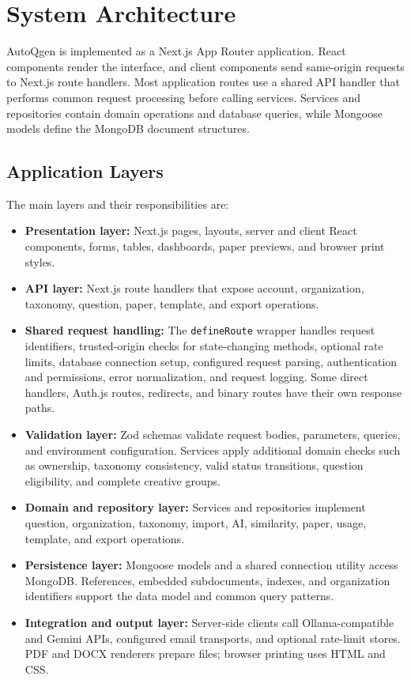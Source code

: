 \section{System Architecture}

AutoQgen is implemented as a Next.js App Router application. React components render the interface, and client components send same-origin requests to Next.js route handlers. Most application routes use a shared API handler that performs common request processing before calling services. Services and repositories contain domain operations and database queries, while Mongoose models define the MongoDB document structures.

\subsection{Application Layers}

The main layers and their responsibilities are:

\begin{itemize}
    \item \textbf{Presentation layer:} Next.js pages, layouts, server and client React components, forms, tables, dashboards, paper previews, and browser print styles.
    \item \textbf{API layer:} Next.js route handlers that expose account, organization, taxonomy, question, paper, template, and export operations.
    \item \textbf{Shared request handling:} The \texttt{defineRoute} wrapper handles request identifiers, trusted-origin checks for state-changing methods, optional rate limits, database connection setup, configured request parsing, authentication and permissions, error normalization, and request logging. Some direct handlers, Auth.js routes, redirects, and binary routes have their own response paths.
    \item \textbf{Validation layer:} Zod schemas validate request bodies, parameters, queries, and environment configuration. Services apply additional domain checks such as ownership, taxonomy consistency, valid status transitions, question eligibility, and complete creative groups.
    \item \textbf{Domain and repository layer:} Services and repositories implement question, organization, taxonomy, import, AI, similarity, paper, usage, template, and export operations.
    \item \textbf{Persistence layer:} Mongoose models and a shared connection utility access MongoDB. References, embedded subdocuments, indexes, and organization identifiers support the data model and common query patterns.
    \item \textbf{Integration and output layer:} Server-side clients call Ollama-compatible and Gemini APIs, configured email transports, and optional rate-limit stores. PDF and DOCX renderers prepare files; browser printing uses HTML and CSS.
\end{itemize}

